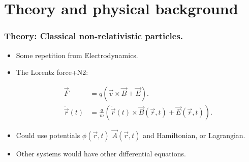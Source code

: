 \documentclass{beamer}
\begin{document}
    \section{Theory and physical background}
\fi

\begin{frame}
\frametitle{Theory: Classical non-relativistic particles.}
\begin{itemize}
\item<1-> Some repetition from Electrodynamics.
\item<2-> The Lorentz force+N2:

\begin{align*}
\vec{F} &= q ( \vec{v}\times \vec{B}+\vec{E}).\\
\ddot{\vec{r}}(t) &= \frac{q}{m} ( \dot{\vec{r}}(t)\times \vec{B}(\vec{r},t)+\vec{E}(\vec{r},t)).
\end{align*}

\item<3-> Could use potentials $\phi(\vec{r},t)$ $\vec{A}(\vec{r},t)$ and Hamiltonian, or Lagrangian.

\item<4-> Other systems would have other differential equations.

\end{itemize}
\end{frame}
\end{document}
